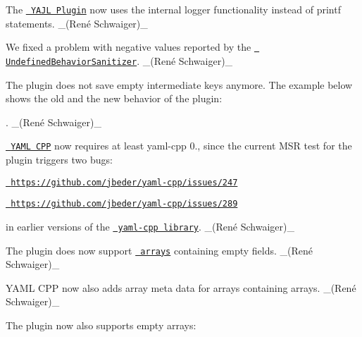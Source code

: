 \begin{DoxyItemize}
\item The \href{http://libelektra.org/plugins/yajl}{\texttt{ Y\+A\+JL Plugin}} now uses the internal logger functionality instead of {\ttfamily printf} statements. \+\_\+(René Schwaiger)\+\_\+
\item We fixed a problem with negative values reported by the \href{https://clang.llvm.org/docs/UndefinedBehaviorSanitizer.html}{\texttt{ Undefined\+Behavior\+Sanitizer}}. \+\_\+(René Schwaiger)\+\_\+
\end{DoxyItemize}


\begin{DoxyItemize}
\item The plugin does not save empty intermediate keys anymore. The example below shows the old and the new behavior of the plugin\+:
\end{DoxyItemize}


\begin{DoxyCode}{0}
\DoxyCodeLine{}
\DoxyCodeLine{}
\end{DoxyCode}


. \+\_\+(René Schwaiger)\+\_\+


\begin{DoxyItemize}
\item \href{http://libelektra.org/plugins/yamlcpp}{\texttt{ Y\+A\+ML C\+PP}} now requires at least {\ttfamily yaml-\/cpp 0.}, since the current M\+SR test for the plugin triggers two bugs\+:
\begin{DoxyItemize}
\item \href{https://github.com/jbeder/yaml-cpp/issues/247}{\texttt{ https\+://github.\+com/jbeder/yaml-\/cpp/issues/247}}
\item \href{https://github.com/jbeder/yaml-cpp/issues/289}{\texttt{ https\+://github.\+com/jbeder/yaml-\/cpp/issues/289}}
\end{DoxyItemize}

in earlier versions of the \href{https://github.com/jbeder/yaml-cpp}{\texttt{ yaml-\/cpp library}}. \+\_\+(René Schwaiger)\+\_\+
\item The plugin does now support \href{https://www.libelektra.org/tutorials/arrays}{\texttt{ arrays}} containing empty fields. \+\_\+(René Schwaiger)\+\_\+
\item Y\+A\+ML C\+PP now also adds {\ttfamily array} meta data for arrays containing arrays. \+\_\+(René Schwaiger)\+\_\+
\item The plugin now also supports empty arrays\+:
\end{DoxyItemize}


